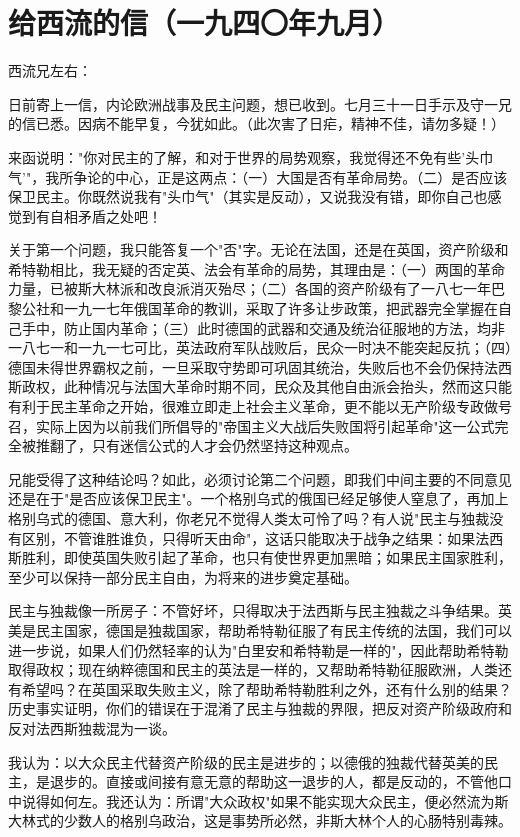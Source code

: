 \documentclass[
  openany,           %
  12pt,              %
  a4paper            %
]{ctexbook}
\begin{document}
\chapter{给西流的信（一九四〇年九月）}

\quad\quad 西流兄左右：

日前寄上一信，内论欧洲战事及民主问题，想已收到。七月三十一日手示及守一兄的信已悉。因病不能早复，今犹如此。（此次害了日疟，精神不佳，请勿多疑！）

来函说明："你对民主的了解，和对于世界的局势观察，我觉得还不免有些'头巾气'"，我所争论的中心，正是这两点：（一）大国是否有革命局势。（二）是否应该保卫民主。你既然说我有"头巾气"（其实是反动），又说我没有错，即你自己也感觉到有自相矛盾之处吧！

关于第一个问题，我只能答复一个"否"字。无论在法国，还是在英国，资产阶级和希特勒相比，我无疑的否定英、法会有革命的局势，其理由是：（一）两国的革命力量，已被斯大林派和改良派消灭殆尽；（二）各国的资产阶级有了一八七一年巴黎公社和一九一七年俄国革命的教训，采取了许多让步政策，把武器完全掌握在自己手中，防止国内革命；（三）此时德国的武器和交通及统治征服地的方法，均非一八七一和一九一七可比，英法政府军队战败后，民众一时决不能突起反抗；（四）德国未得世界霸权之前，一旦采取守势即可巩固其统治，失败后也不会仍保持法西斯政权，此种情况与法国大革命时期不同，民众及其他自由派会抬头，然而这只能有利于民主革命之开始，很难立即走上社会主义革命，更不能以无产阶级专政做号召，实际上因为以前我们所倡导的"帝国主义大战后失败国将引起革命"这一公式完全被推翻了，只有迷信公式的人才会仍然坚持这种观点。

兄能受得了这种结论吗？如此，必须讨论第二个问题，即我们中间主要的不同意见还是在于"是否应该保卫民主"。一个格别乌式的俄国已经足够使人窒息了，再加上格别乌式的德国、意大利，你老兄不觉得人类太可怜了吗？有人说"民主与独裁没有区别，不管谁胜谁负，只得听天由命"，这话只能取决于战争之结果：如果法西斯胜利，即使英国失败引起了革命，也只有使世界更加黑暗；如果民主国家胜利，至少可以保持一部分民主自由，为将来的进步奠定基础。

民主与独裁像一所房子：不管好坏，只得取决于法西斯与民主独裁之斗争结果。英美是民主国家，德国是独裁国家，帮助希特勒征服了有民主传统的法国，我们可以进一步说，如果人们仍然轻率的认为"白里安和希特勒是一样的"，因此帮助希特勒取得政权；现在纳粹德国和民主的英法是一样的，又帮助希特勒征服欧洲，人类还有希望吗？在英国采取失败主义，除了帮助希特勒胜利之外，还有什么别的结果？历史事实证明，你们的错误在于混淆了民主与独裁的界限，把反对资产阶级政府和反对法西斯独裁混为一谈。

我认为：以大众民主代替资产阶级的民主是进步的；以德俄的独裁代替英美的民主，是退步的。直接或间接有意无意的帮助这一退步的人，都是反动的，不管他口中说得如何左。我还认为：所谓"大众政权"如果不能实现大众民主，便必然流为斯大林式的少数人的格别乌政治，这是事势所必然，非斯大林个人的心肠特别毒辣。
\end{document}

